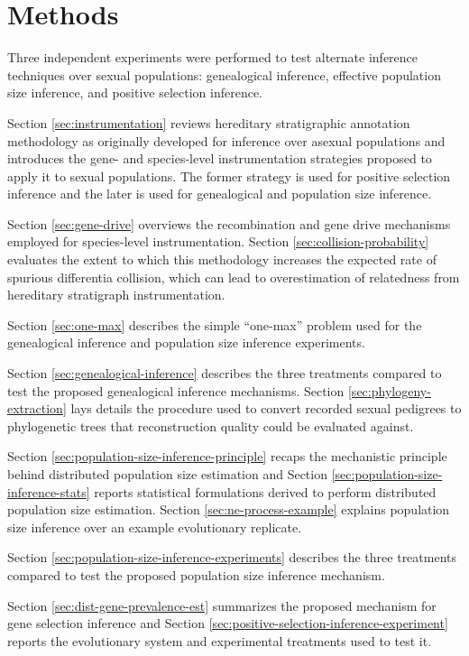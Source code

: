 \section{Methods} \label{sec:methods}

Three independent experiments were performed to test alternate inference techniques over sexual populations: genealogical inference, effective population size inference, and positive selection inference.

Section \ref{sec:instrumentation} reviews hereditary stratigraphic annotation methodology as originally developed for inference over asexual populations and introduces the gene- and species-level instrumentation strategies proposed to apply it to sexual populations.
The former strategy is used for positive selection inference and the later is used for genealogical and population size inference.

Section \ref{sec:gene-drive} overviews the recombination and gene drive mechanisms employed for species-level instrumentation.
Section \ref{sec:collision-probability} evaluates the extent to which this methodology increases the expected rate of spurious differentia collision, which can lead to overestimation of relatedness from hereditary stratigraph instrumentation.

Section \ref{sec:one-max} describes the simple ``one-max'' problem used for the genealogical inference and population size inference experiments.

Section \ref{sec:genealogical-inference} describes the three treatments compared to test the proposed genealogical inference mechanisms.
Section \ref{sec:phylogeny-extraction} lays details the procedure used to convert recorded sexual pedigrees to phylogenetic trees that reconstruction quality could be evaluated against.

Section \ref{sec:population-size-inference-principle} recaps the mechanistic principle behind distributed population size estimation and Section \ref{sec:population-size-inference-stats} reports statistical formulations derived to perform distributed population size estimation.
Section \ref{sec:ne-process-example} explains population size inference over an example evolutionary replicate.

Section \ref{sec:population-size-inference-experiments} describes the three treatments compared to test the proposed population size inference mechanism.

Section \ref{sec:dist-gene-prevalence-est} summarizes the proposed mechanism for gene selection inference and Section \ref{sec:positive-selection-inference-experiment} reports the evolutionary system and experimental treatments used to test it.

